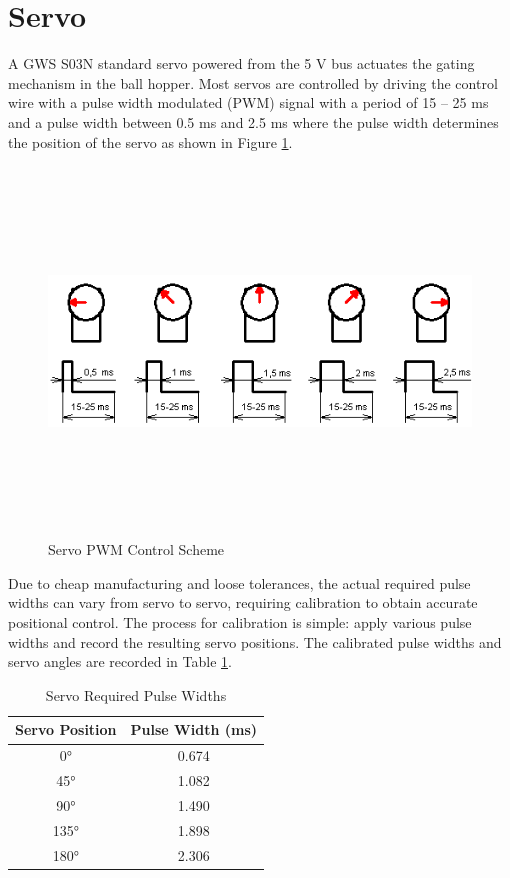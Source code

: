 \section{Servo}
A GWS S03N standard servo powered from the 5 V bus actuates the gating mechanism in the ball hopper. Most servos are controlled by driving the control wire with a pulse width modulated (PWM) signal with a period of 15 -- 25 ms and a pulse width between 0.5 ms and 2.5 ms where the pulse width determines the position of the servo as shown in Figure \ref{fig:servo_pulse_width}. 

\begin{figure}[H]   %
	\centering \includegraphics[width=6in, height=3.85in, keepaspectratio]{figures/servo_pulse_width.png}
	\caption{Servo PWM Control Scheme \cite{servo_pulse_width}}\label{fig:servo_pulse_width}
\end{figure}

Due to cheap manufacturing and loose tolerances, the actual required pulse widths can vary from servo to servo, requiring calibration to obtain accurate positional control. The process for calibration is simple: apply various pulse widths and record the resulting servo positions. The calibrated pulse widths and servo angles are recorded in Table \ref{tab:servo_angles}.

\begin{table}[h]
	\centering	\caption{Servo Required Pulse Widths}
	\begin{tabular}{cc}
		\hline 
		Servo Position & Pulse Width (ms) \\ \hline 
		\ang{0} & 0.674 \\ \hline 
		\ang{45} & 1.082 \\ \hline 
		\ang{90} & 1.490 \\ \hline 
		\ang{135} & 1.898 \\ \hline 
		\ang{180} & 2.306 \\ \hline 
	\end{tabular} 
	\label{tab:servo_angles}
\end{table}

